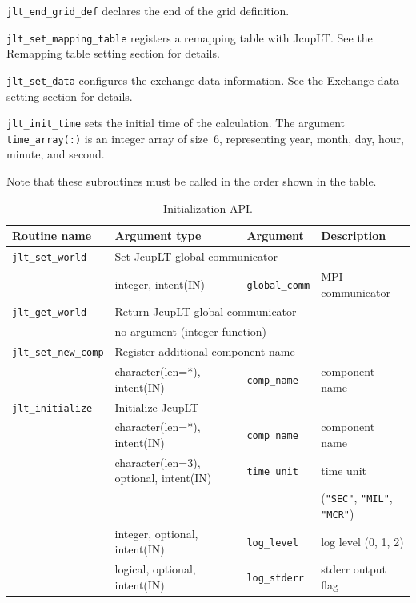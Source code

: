 \documentclass[11pt,a4paper]{report}
\begin{document}
\texttt{jlt\_end\_grid\_def} declares
the end of the grid definition.

\texttt{jlt\_set\_mapping\_table} registers
a remapping table with JcupLT.
See the Remapping table setting section for details.

\texttt{jlt\_set\_data} configures
the exchange data information.
See the Exchange data setting section for details.

\texttt{jlt\_init\_time} sets the initial time
of the calculation.
The argument \texttt{time\_array(:)} is an integer array
of size~6, representing
year, month, day, hour, minute, and second.

Note that these subroutines must be called
in the order shown in the table.

\begin{table}[H]
\begin{center}
\caption{Initialization API.}
{\small
\label{table:jlt_api_initialize}
\begin{tabular}{llll}
\hline\hline
Routine name & Argument type & Argument & Description \\
\hline
\hline
\texttt{jlt\_set\_world} & \multicolumn{3}{l}{Set JcupLT global communicator} \\
                & integer, intent(IN) & \texttt{global\_comm} & MPI communicator\\
\hline
 \texttt{jlt\_get\_world} & \multicolumn{3}{l}{Return JcupLT global communicator} \\
                & \multicolumn{3}{l}{no argument (integer function)} \\
\hline
 \texttt{jlt\_set\_new\_comp} & \multicolumn{3}{l}{Register additional component name} \\
                & character(len=*), intent(IN) & \texttt{comp\_name} & component name\\
\hline
 \texttt{jlt\_initialize} &  \multicolumn{3}{l}{Initialize JcupLT}\\
           &  character(len=*), intent(IN) &  \texttt{comp\_name} & component name\\
           &  character(len=3), optional, intent(IN)
             &  \texttt{time\_unit} & time unit \\
           &  & & (\texttt{"SEC"}, \texttt{"MIL"}, \texttt{"MCR"})\\
           &  integer, optional, intent(IN) &  \texttt{log\_level} & log level (0, 1, 2)\\
           &  logical, optional, intent(IN) &  \texttt{log\_stderr} & stderr output flag\\

\end{tabular}}
\end{center}
\end{table}
\end{document}
